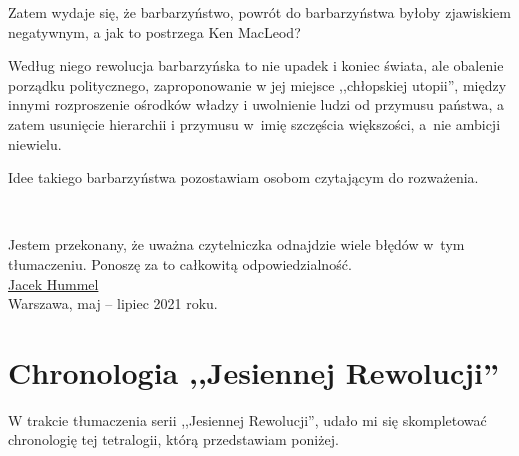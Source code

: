 \documentclass[oneside,polish,11pt,sfheadings]{mwbk}
\begin{document}
Zatem wydaje się, że barbarzyństwo, powrót do barbarzyństwa byłoby zjawiskiem negatywnym, a jak to postrzega Ken MacLeod?

Według niego rewolucja barbarzyńska to nie upadek i koniec świata, ale obalenie porządku politycznego, zaproponowanie w jej miejsce ,,chłopskiej utopii'', między innymi rozproszenie ośrodków władzy i uwolnienie ludzi od przymusu państwa, a zatem usunięcie hierarchii i przymusu w~imię szczęścia większości, a~nie ambicji niewielu.

Idee takiego barbarzyństwa pozostawiam osobom czytającym do rozważenia.

~

Jestem przekonany, że uważna czytelniczka odnajdzie wiele błędów w~tym tłumaczeniu. Ponoszę za to całkowitą odpowiedzialność.\\

\href{mailto:theskymyladythesky@zoho.eu}{Jacek Hummel}\\

Warszawa, maj -- lipiec 2021 roku.

\chapter*{Chronologia ,,Jesiennej Rewolucji''}

W trakcie tłumaczenia serii ,,Jesiennej Rewolucji'', udało mi się skompletować chronologię tej tetralogii, którą przedstawiam poniżej.
\end{document}

